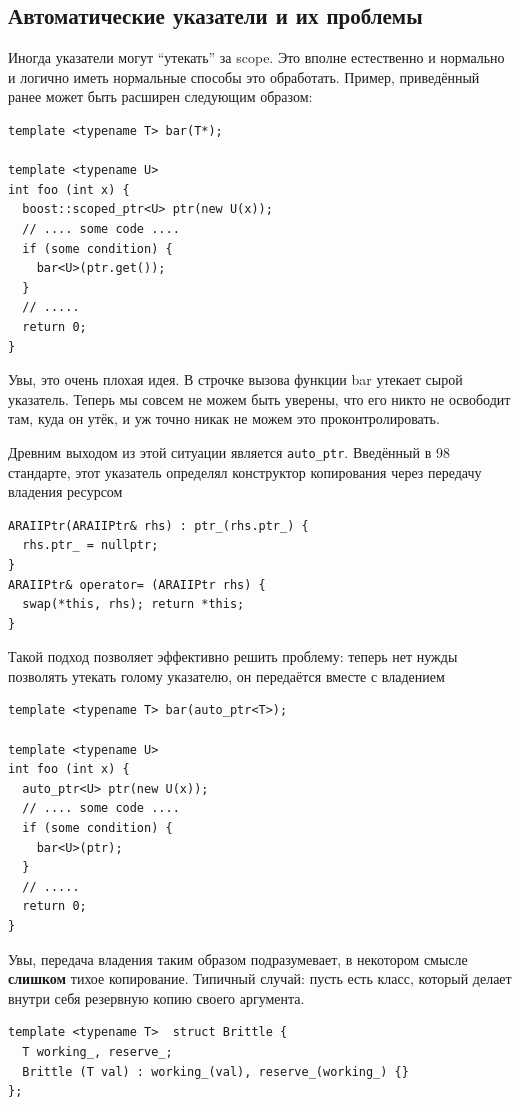 \documentclass[a4paper,12pt,oneside]{book}
\begin{document}
\subsection{Автоматические указатели и их проблемы}\label{COAP}

Иногда указатели могут ``утекать'' за scope. Это вполне естественно и нормально и логично иметь нормальные способы это обработать. Пример, приведённый ранее может быть расширен следующим образом:

\begin{lstlisting}
template <typename T> bar(T*);

template <typename U>
int foo (int x) {
  boost::scoped_ptr<U> ptr(new U(x));
  // .... some code ....
  if (some condition) {
    bar<U>(ptr.get());
  }
  // .....
  return 0;
}
\end{lstlisting}

Увы, это очень плохая идея. В строчке вызова функции bar утекает сырой указатель. Теперь мы совсем не можем быть уверены, что его никто не освободит там, куда он утёк, и уж точно никак не можем это проконтролировать.

Древним выходом из этой ситуации является \lstinline!auto_ptr!. Введённый в 98 стандарте, этот указатель определял конструктор копирования через передачу владения ресурсом

\begin{lstlisting}
ARAIIPtr(ARAIIPtr& rhs) : ptr_(rhs.ptr_) { 
  rhs.ptr_ = nullptr; 
}
ARAIIPtr& operator= (ARAIIPtr rhs) { 
  swap(*this, rhs); return *this; 
}
\end{lstlisting}

Такой подход позволяет эффективно решить проблему: теперь нет нужды позволять утекать голому указателю, он передаётся вместе с владением

\begin{lstlisting}
template <typename T> bar(auto_ptr<T>);

template <typename U>
int foo (int x) {
  auto_ptr<U> ptr(new U(x));
  // .... some code ....
  if (some condition) {
    bar<U>(ptr);
  }
  // .....
  return 0;
}
\end{lstlisting}

Увы, передача владения таким образом подразумевает, в некотором смысле \textbf{слишком} тихое копирование. Типичный случай: пусть есть класс, который делает внутри себя резервную копию своего аргумента.

\begin{lstlisting}
template <typename T>  struct Brittle {
  T working_, reserve_;
  Brittle (T val) : working_(val), reserve_(working_) {}
};
\end{lstlisting}
\end{document}
